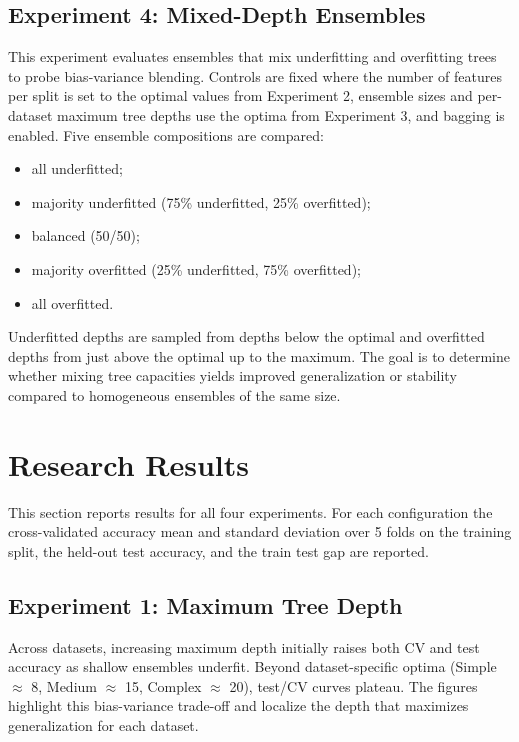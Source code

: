 \documentclass[conference]{IEEEtran}
\begin{document}
\subsection{Experiment 4: Mixed-Depth Ensembles}
This experiment evaluates ensembles that mix underfitting and overfitting trees to probe bias-variance blending. Controls are fixed where the number of 
features per split is set to the optimal values from Experiment 2, ensemble sizes and per-dataset maximum tree depths use the optima from Experiment 3, and bagging is enabled. 
Five ensemble compositions are compared:
\begin{itemize}
  \item all underfitted;
  \item majority underfitted (75\% underfitted, 25\% overfitted);
  \item balanced (50/50);
  \item majority overfitted (25\% underfitted, 75\% overfitted);
  \item all overfitted. 
\end{itemize}
Underfitted depths are sampled from depths below the optimal and overfitted depths from just above the optimal up to the maximum. The goal is to determine whether mixing tree capacities yields improved generalization or stability compared to homogeneous ensembles of the same size.



\section{Research Results}

\label{sec:results}

This section reports results for all four experiments. For each configuration the cross-validated accuracy mean and standard deviation over 5 folds on 
the training split, the held-out test accuracy, and the train test gap are reported. 


\subsection{Experiment 1: Maximum Tree Depth}
\label{sec:results-exp1}

Across datasets, increasing maximum depth initially raises both CV and test accuracy as shallow ensembles underfit. Beyond dataset-specific optima (Simple $\approx$ 8, Medium $\approx$ 15, Complex $\approx$ 20), test/CV curves plateau. The figures highlight this bias-variance trade-off and localize the depth that maximizes generalization for each dataset.
\end{document}
